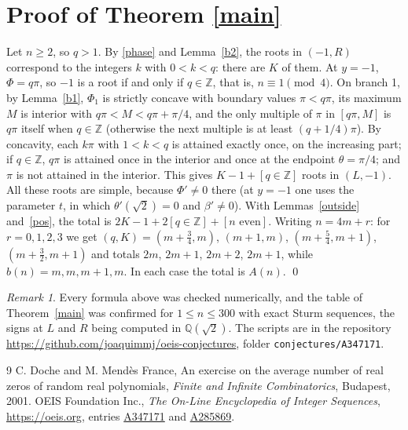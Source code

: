 \documentclass[11pt]{article}
\theoremstyle{remark}\newtheorem{remark}[theorem]{Remark}
\newcommand{\oeis}[1]{\href{https://oeis.org/#1}{#1}}
\begin{document}
\section{Proof of Theorem \ref{main}}
Let $n\ge2$, so $q>1$. By \eqref{phase} and Lemma~\ref{b2}, the roots in $(-1,R)$ correspond to the integers
$k$ with $0<k<q$: there are $K$ of them. At $y=-1$, $\Phi=q\pi$, so $-1$ is a root if and only if
$q\in\mathbb Z$, that is, $n\equiv1\pmod4$. On branch 1, by Lemma~\ref{b1}, $\Phi_1$ is strictly concave with
boundary values $\pi<q\pi$, its maximum $M$ is interior with $q\pi<M<q\pi+\pi/4$, and the only multiple of
$\pi$ in $[q\pi,M]$ is $q\pi$ itself when $q\in\mathbb Z$ (otherwise the next multiple is at least
$(q+1/4)\pi$). By concavity, each $k\pi$ with $1<k<q$ is attained exactly once, on the increasing part; if
$q\in\mathbb Z$, $q\pi$ is attained once in the interior and once at the endpoint $\theta=\pi/4$; and $\pi$ is
not attained in the interior. This gives $K-1+[q\in\mathbb Z]$ roots in $(L,-1)$. All these roots are simple,
because $\Phi'\ne0$ there (at $y=-1$ one uses the parameter $t$, in which $\theta'(\sqrt2)=0$ and $\beta'\ne0$).
With Lemmas~\ref{outside} and~\ref{pos}, the total is $2K-1+2[q\in\mathbb Z]+[n\text{ even}]$.
Writing $n=4m+r$: for $r=0,1,2,3$ we get $(q,K)=(m+\tfrac34,m)$, $(m+1,m)$, $(m+\tfrac54,m+1)$,
$(m+\tfrac32,m+1)$ and totals $2m$, $2m+1$, $2m+2$, $2m+1$, while $b(n)=m,m,m+1,m$. In each case the total
is $A(n)$. \qed

\begin{remark}
Every formula above was checked numerically, and the table of Theorem~\ref{main} was confirmed for
$1\le n\le300$ with exact Sturm sequences, the signs at $L$ and $R$ being computed in $\mathbb Q(\sqrt2)$.
The scripts are in the repository \url{https://github.com/joaquimmj/oeis-conjectures}, folder
\texttt{conjectures/A347171}.
\end{remark}

\begin{thebibliography}{9}
 C. Doche and M. Mend\`es France, An exercise on the average number of real zeros of random
real polynomials, \emph{Finite and Infinite Combinatorics}, Budapest, 2001.
 OEIS Foundation Inc., \emph{The On-Line Encyclopedia of Integer Sequences},
\url{https://oeis.org}, entries \oeis{A347171} and \oeis{A285869}.
\end{thebibliography}
\end{document}
